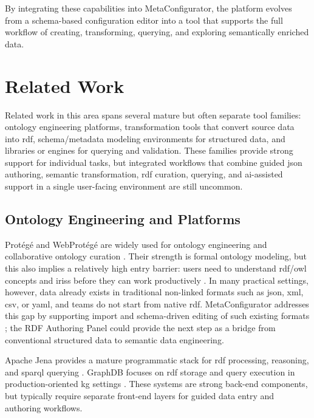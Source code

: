 By integrating these capabilities into MetaConfigurator, the platform evolves from a schema-based configuration editor into a tool that supports the full workflow of creating, transforming, querying, and exploring semantically enriched data.

\section{Related Work}
\label{sec:background:related_work}

Related work in this area spans several mature but often separate tool families: ontology engineering platforms, transformation tools that convert source data into \gls{rdf}, schema/metadata modeling environments for structured data, and libraries or engines for querying and validation. These families provide strong support for individual tasks, but integrated workflows that combine guided \gls{json} authoring, semantic transformation, \gls{rdf} curation, querying, and \gls{ai}-assisted support in a single user-facing environment are still uncommon.

\subsection{Ontology Engineering and  Platforms}

Protégé and WebProtégé are widely used for ontology engineering and collaborative ontology curation \cite{protege,webprotege}. Their strength is formal ontology modeling, but this also implies a relatively high entry barrier: users need to understand \gls{rdf}/\gls{owl} concepts and \glspl{iri}s before they can work productively \cite{janowicz2015geospatial,hogan2021knowledgegraphs}. In many practical settings, however, data already exists in traditional non-linked formats such as \gls{json}, \gls{xml}, \gls{csv}, or \gls{yaml}, and teams do not start from native \gls{rdf}. MetaConfigurator addresses this gap by supporting import and schema-driven editing of such existing formats \cite{metaconfigurator2024,metaconfigurator2025datamodels}; the RDF Authoring Panel could provide the next step as a bridge from conventional structured data to semantic data engineering.

Apache Jena provides a mature programmatic stack for \gls{rdf} processing, reasoning, and \gls{sparql} querying \cite{apache_jena}. GraphDB focuses on \gls{rdf} storage and query execution in production-oriented \gls{kg} settings \cite{graphdb}. These systems are strong back-end components, but typically require separate front-end layers for guided data entry and authoring workflows.

